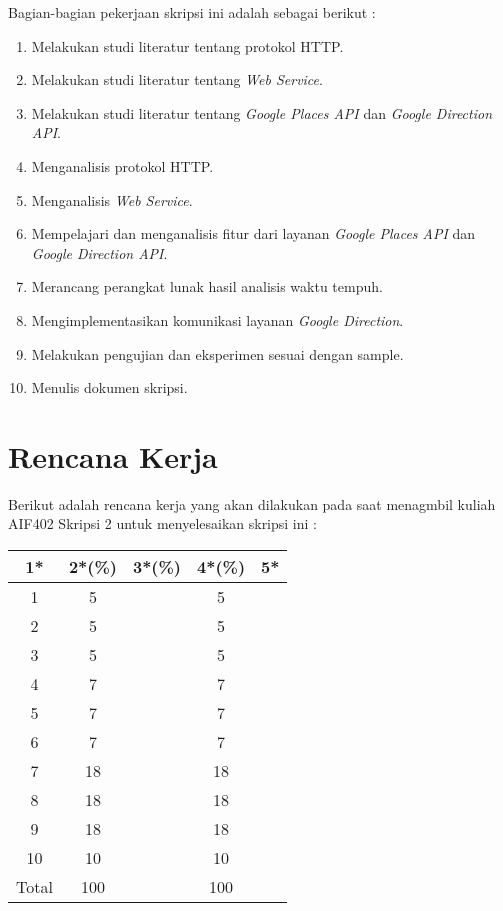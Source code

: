 \documentclass[a4paper,twoside]{article}
\begin{document}
Bagian-bagian pekerjaan skripsi ini adalah sebagai berikut :
	\begin{enumerate}
		\item Melakukan studi literatur tentang protokol HTTP.
		\item Melakukan studi literatur tentang \textit{Web Service}.
		\item Melakukan studi literatur tentang \textit{Google Places API} dan \textit{Google Direction API}.
		\item Menganalisis protokol HTTP.
		\item Menganalisis \textit{Web Service}.
		\item Mempelajari dan menganalisis fitur dari layanan \textit{Google Places API} dan \textit{Google Direction API}.
		\item Merancang perangkat lunak hasil analisis waktu tempuh.
		\item Mengimplementasikan komunikasi layanan \textit{Google Direction}.
		\item Melakukan pengujian dan eksperimen sesuai dengan sample.
		\item Menulis dokumen skripsi.
	\end{enumerate}

\section{Rencana Kerja}

Berikut adalah rencana kerja yang akan dilakukan pada saat menagmbil kuliah AIF402 Skripsi 2 untuk menyelesaikan skripsi ini :

\begin{center}
  \begin{tabular}{ | c | c | c | c | l |}
    \hline
    1*  & 2*(\%) & 3*(\%) & 4*(\%) &5*\\ \hline \hline
    1   & 5  &    & 5  & \\ \hline
    2   & 5  &    & 5  & \\ \hline
    3   & 5  &    & 5  & \\ \hline
    4   & 7  &    & 7  & \\ \hline
    5   & 7  &    & 7  & \\ \hline
    6   & 7  &    & 7  & \\ \hline
    7   & 18 &    & 18 & \\ \hline
    8   & 18 &    & 18 & \\ \hline
    9   & 18 &    & 18 & \\ \hline
    10  & 10 &    & 10 & \\ \hline
    Total  & 100  &    & 100 &  \\ \hline
                          \end{tabular}
\end{center}
\end{document}
